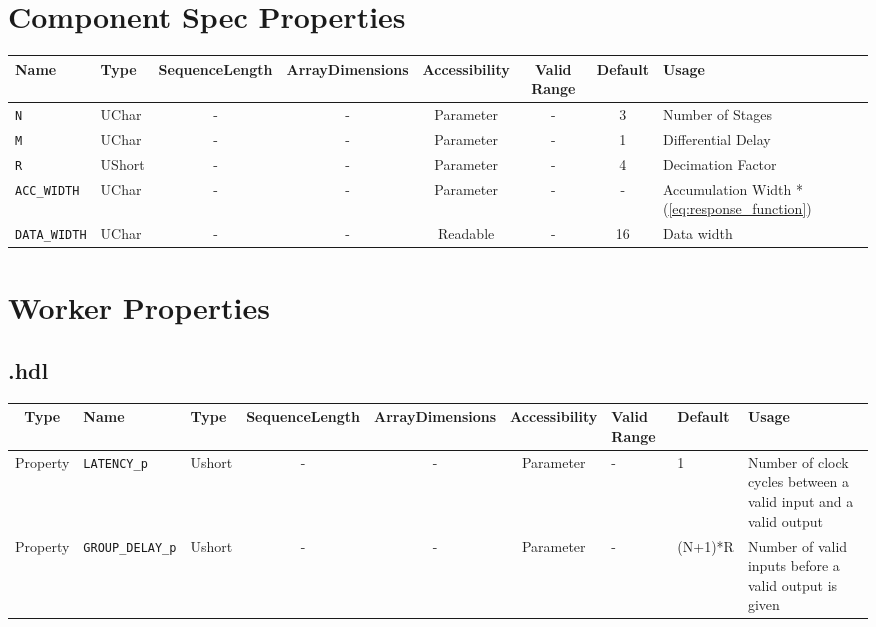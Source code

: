 \begin{landscape}
	\section*{Component Spec Properties}
	\begin{scriptsize}
		\begin{tabular}{|p{3cm}|p{1.5cm}|c|c|c|c|c|p{7cm}|}
			\hline
			\rowcolor{blue}
			Name                      & Type   & SequenceLength & ArrayDimensions & Accessibility      & Valid Range & Default & Usage                                            \\
			\hline \verb+N+           & UChar  & -              & -               & Parameter          & -           & 3       & Number of Stages                                 \\
			\hline \verb+M+           & UChar  & -              & -               & Parameter          & -           & 1       & Differential Delay                               \\
			\hline \verb+R+           & UShort & -              & -               & Parameter          & -           & 4       & Decimation Factor                                \\
			\hline \verb+ACC_WIDTH+   & UChar  & -              & -               & Parameter          & -           & -       & Accumulation Width *(\ref{eq:response_function}) \\
			\hline \verb+DATA_WIDTH+  & UChar  & -              & -               & Readable           & -           & 16      & Data width                                       \\
			\hline
		\end{tabular}
	\end{scriptsize}
	\section*{Worker Properties}

	\subsection*{\comp.hdl}
	\begin{scriptsize}
		\begin{tabular}{|c|p{2cm}|p{1cm}|c|c|c|p{2cm}|p{1cm}|p{5cm}|}
			\hline
			\rowcolor{blue}
			Type         & Name              		& Type 		& SequenceLength & ArrayDimensions & Accessibility & Valid Range & Default & Usage                                            \\
			\hline
			Property     & \verb+LATENCY_p+      	& Ushort	& -             & -                & Parameter     & -           & 1       & Number of clock cycles between a valid input and a valid output\\ 			\hline
			Property     & \verb+GROUP_DELAY_p+  	& Ushort	& -             & -                & Parameter     & -           & (N+1)*R & Number of valid inputs before a valid output is given\\
			\hline
		\end{tabular}
	\end{scriptsize}


\end{landscape}

